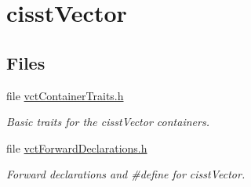 \hypertarget{group__cisst_vector}{}\section{cisst\+Vector}
\label{group__cisst_vector}
\subsection*{Files}
\begin{DoxyCompactItemize}
\item 
file \hyperlink{vct_container_traits_8h}{vct\+Container\+Traits.\+h}
\begin{DoxyCompactList}\small\item\em Basic traits for the cisst\+Vector containers. \end{DoxyCompactList}\item 
file \hyperlink{vct_forward_declarations_8h}{vct\+Forward\+Declarations.\+h}
\begin{DoxyCompactList}\small\item\em Forward declarations and \#define for cisst\+Vector. \end{DoxyCompactList}\end{DoxyCompactItemize}
